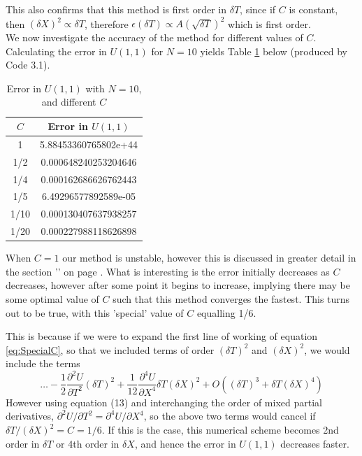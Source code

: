 \documentclass[10pt,a4paper,notitlepage]{article}
\begin{document}
This also confirms that this method is first order in $\delta T$, since if $C$ is constant, then $\left(\delta X\right)^{2} \propto \delta T$, therefore $\epsilon\left(\delta T\right)\propto A \left(\sqrt{\delta T}\right)^{2}$ which is first order.\\

We now investigate the accuracy of the method for different values of $C$.
Calculating the error in $U(1,1)$ for $N=10$ yields Table \ref{tb:C error} below (produced by Code 3.1).
\begin{table}[H]
\centering
\begin{tabular}{|c|c|}
\hline
$C$ & Error in $U(1,1)$    \\ \hline
1 & 5.88453360765802e+44 \\
1/2                      & 0.000648240253204646 \\
1/4                      & 0.000162686626762443 \\
1/5                      & 6.49296577892589e-05 \\
1/10                     & 0.000130407637938257 \\
1/20                     & 0.000227988118626898 \\ \hline
\end{tabular}
\caption{Error in $U(1,1)$ with $N=10$, and different $C$}\label{tb:C error}
\end{table}
When $C=1$ our method is unstable, however this is discussed in greater detail in the section '' on page \pageref{subsec:StabSol}. What is interesting is the error initially decreases as $C$ decreases, however after some point it begins to increase, implying there may be some optimal value of $C$ such that this method converges the fastest.  This turns out to be true, with this 'special' value of $C$ equalling 1/6. \par
This is because if we were to expand the first line of working of equation \eqref{eq:SpecialC}, so that we included terms of order $\left(\delta T\right)^{2}$ and $\left(\delta X\right)^{2}$, we would include the terms
\begin{equation}
\hdots - \frac{1}{2}\frac{\partial^{2} U}{\partial T^{2}}\left(\delta T\right)^{2} +\frac{1}{12}\frac{\partial^{4} U}{\partial X^{4}}\delta T\left(\delta X\right)^{2} +O\left(\left(\delta T\right)^{3}+\delta T\left(\delta X\right)^{4}\right)
\end{equation}
However using equation (13) and interchanging the order of mixed partial derivatives, $
\partial^{2}U/\partial T^{2}=\partial^{4}U/\partial X^{4}$, so the above two terms would cancel if $\delta T/\left(\delta X\right)^{2}=C=1/6$. If this is the case, this numerical scheme becomes 2nd order in $\delta T$ or 4th order in $\delta X$, and hence the error in $U(1,1)$ decreases faster.
\end{document}
